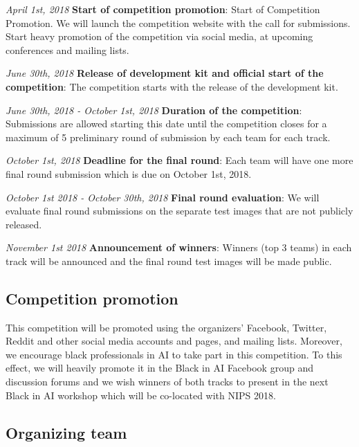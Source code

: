 \documentclass[11pt, oneside]{article}
\begin{document}
{\it April 1st, 2018} {\bf Start of competition promotion}: Start of Competition Promotion. We will launch the competition website with the call for submissions. Start heavy promotion of the competition via social media, at upcoming conferences and mailing lists.

{\it June 30th, 2018} {\bf Release of development kit and official start of the competition}: The competition starts with the release of the development kit. 

{\it June 30th, 2018 - October 1st, 2018} {\bf Duration of the competition}: Submissions are allowed starting this date until the competition closes for a maximum of 5 preliminary round of submission by each team for each track.

{\it October 1st, 2018} {\bf Deadline for the final round}: Each team will have one more final round submission which is due on October 1st, 2018.

{\it October 1st 2018 - October 30th, 2018} {\bf Final round evaluation}: We will evaluate final round submissions on the separate test images that are not publicly released.

{\it November 1st 2018} {\bf Announcement of winners}: Winners (top 3 teams) in each track will be announced and the final round test images will be made public.

\subsection{Competition promotion}

This competition will be promoted using the organizers' Facebook, Twitter, Reddit and other social media accounts and pages, and mailing lists. Moreover, we encourage black professionals in AI to take part in this competition. To this effect, we will heavily promote it in the Black in AI Facebook group and discussion forums and we wish winners of both tracks to present in the next Black in AI workshop which will be co-located with NIPS 2018.

\subsection{Organizing team}
\end{document}
